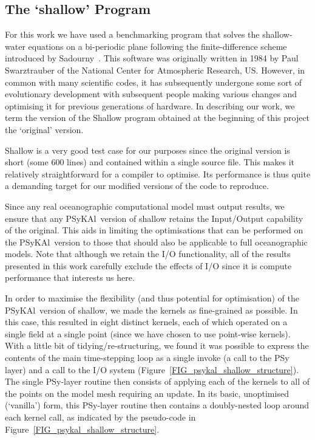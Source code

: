\documentclass{IOS-Book-Article}
\newcommand{\psykal}{{PS}y{KA}l\ }
\begin{document}
\subsection{The `shallow' Program}
For this work we have used a benchmarking program that solves the
shallow-water equations on a bi-periodic plane following the
finite-difference scheme introduced by Sadourny~\cite{sadourny75}.
This software was originally written in 1984 by Paul Swarztrauber of
the National Center for Atmospheric Research, US.  However, in common
with many scientific codes, it has subsequently undergone some sort of
evolutionary development with subsequent people making various changes
and optimising it for previous generations of hardware.  In describing
our work, we term the version of the Shallow program obtained at the
beginning of this project the `original' version.

Shallow is a very good test case for our purposes since the original
version is short (some 600 lines) and contained within a single source
file. This makes it relatively straightforward for a compiler to
optimise. Its performance is thus quite a demanding target for our
modified versions of the code to reproduce.

Since any real oceanographic computational model must output results,
we ensure that any \psykal version of shallow retains the Input/Output
capability of the original. This aids in limiting the optimisations
that can be performed on the \psykal version to those that should also
be applicable to full oceanographic models. Note that although we
retain the I/O functionality, all of the results presented in this work
carefully exclude the effects of I/O since it is compute performance
that interests us here.

In order to maximise the flexibility (and thus potential for
optimisation) of the \psykal version of shallow, we made the kernels
as fine-grained as possible. In this case, this resulted in eight
distinct kernels, each of which operated on a single field at a single
point (since we have chosen to use point-wise kernels). With a little
bit of tidying/re-structuring, we found it was possible to express the
contents of the main time-stepping loop as a single invoke (a call to
the PSy layer) and a call to the I/O system
(Figure~\ref{FIG_psykal_shallow_structure}). The single PSy-layer
routine then consists of applying each of the kernels to all of the
points on the model mesh requiring an update. In its basic,
unoptimised (`vanilla') form, this PSy-layer routine then contains a
doubly-nested loop around each kernel call, as indicated by the
pseudo-code in Figure~\ref{FIG_psykal_shallow_structure}.
\end{document}
